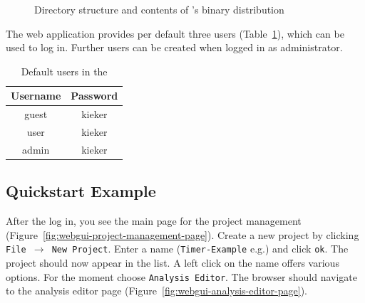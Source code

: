 			\begin{figure}[h!]
				\begin{graybox}
				\end{graybox}
				
				\caption{Directory structure and contents of \KiekerWebGUI{}'s binary distribution}
				\label{fig:webgui-binary-layout}
			\end{figure}
			
			\noindent
			The web application provides per default three users (Table~\ref{tab:webgui-default-users}), which can be used to log in. Further users can be created when logged in as administrator.
			
			\begin{table}[h!]
				\center
				
				\begin{tabular}{|c|c|}
					\hline
					Username & Password\\
					\hline
					\hline
					guest    & kieker\\
					user     & kieker\\
					admin    & kieker\\
					\hline
				\end{tabular}
			
				\caption{Default users in the \KiekerWebGUI{}}
				\label{tab:webgui-default-users}
			\end{table}
			
		\subsection{Quickstart Example}
		
			
			\noindent
			After the log in, you see the main page for the project management (Figure~\ref{fig:webgui-project-management-page}). Create a new project by clicking \texttt{File $\to$ New Project}. Enter a name (\texttt{Timer-Example} e.g.) and click \texttt{ok}. The project should now appear in the list. A left click on the name offers various options. For the moment choose \texttt{Analysis Editor}. The browser should navigate to the analysis editor page (Figure~\ref{fig:webgui-analysis-editor-page}).
			
